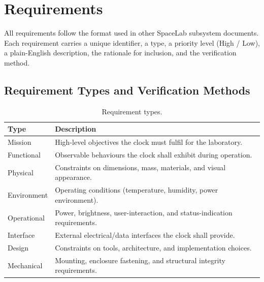 %
%

\chapter{Requirements} \label{ch:requirements}

All requirements follow the format used in other SpaceLab subsystem documents. Each requirement carries a unique identifier, a type, a priority level (High / Low), a plain-English description, the rationale for inclusion, and the verification method.

\section{Requirement Types and Verification Methods}

\begin{table}[H]
    \caption{Requirement types.}
    \label{tab:req-types}
    \begin{center}
        \begin{tabular}{C{3cm}L{10cm}}
            \toprule[1.5pt]
            \textbf{Type} & \textbf{Description} \\
            \midrule
            Mission       & High-level objectives the clock must fulfil for the laboratory. \\
            Functional    & Observable behaviours the clock shall exhibit during operation. \\
            Physical      & Constraints on dimensions, mass, materials, and visual appearance. \\
            Environment   & Operating conditions (temperature, humidity, power environment). \\
            Operational   & Power, brightness, user-interaction, and status-indication requirements. \\
            Interface     & External electrical/data interfaces the clock shall provide. \\
            Design        & Constraints on tools, architecture, and implementation choices. \\
            Mechanical    & Mounting, enclosure fastening, and structural integrity requirements. \\
            \bottomrule[1.5pt]
        \end{tabular}
    \end{center}
\end{table}

